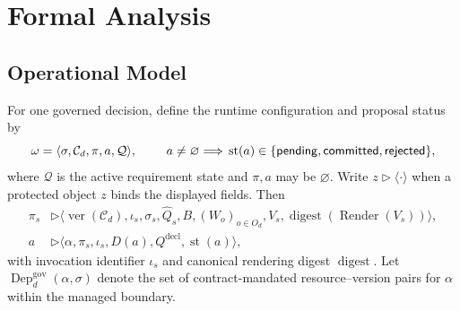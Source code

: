 \section{Formal Analysis}
\label{app:formal-analysis}
\subsection{Operational Model}
For one governed decision, define the runtime configuration and proposal status by
\begin{equation}
\omega=\langle\sigma,\mathcal C_d,\pi,a,\mathcal Q\rangle,
\qquad
\ a\ne\varnothing\Longrightarrow\\
\operatorname{st}(a)\in
\{\mathsf{pending},\mathsf{committed},\mathsf{rejected}\},
\label{eq:runtime-state}
\end{equation}
where $\mathcal Q$ is the active requirement state and $\pi,a$ may be $\varnothing$. Write $z\triangleright\langle\cdot\rangle$ when a protected object $z$ binds the displayed fields. Then
\begin{align}
\pi_s &\triangleright
\langle \operatorname{ver}(\mathcal C_d),\iota_s,\sigma_s,
\widehat Q_s,B,(W_o)_{o\in O_d},V_s,
\operatorname{digest}(\operatorname{Render}(V_s))\rangle,               \label{eq:certificate-fields}\\
a &\triangleright
\langle\alpha,\pi_s,\iota_s,D(a),Q^{\mathrm{decl}},
\operatorname{st}(a)\rangle,                                            \label{eq:proposal-fields}
\end{align}
with invocation identifier $\iota_s$ and canonical rendering digest $\operatorname{digest}$. Let $\operatorname{Dep}^{\mathrm{gov}}_d(\alpha,\sigma)$ denote the set of contract-mandated resource--version pairs for $\alpha$ within the managed boundary.
